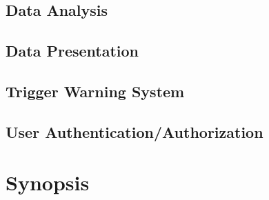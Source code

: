 \subsection{Data Analysis}
\label{subsec:analysis:technical_analysis:data_analysis}

\subsection{Data Presentation}
\label{subsec:analysis:technical_analysis:data_presentation}

\subsection{Trigger Warning System}
\label{subsec:analysis:technical_analysis:data_trigger_warning_system}

\subsection{User Authentication/Authorization}
\label{subsec:analysis:technical_analysis:user_auth}

\section{Synopsis}
\label{sec:analysis:synopsis}
